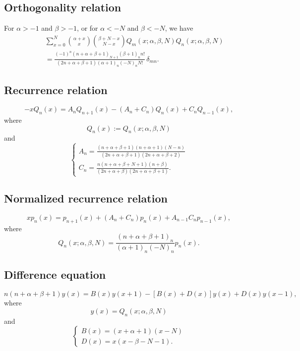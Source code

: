\documentclass[envcountchap,graybox]{svmono}
\begin{document}
\subsection*{Orthogonality relation}
For $\alpha>-1$ and $\beta>-1$, or for $\alpha<-N$ and $\beta<-N$, we have
\begin{eqnarray}
\label{OrtHahn}
& &\sum_{x=0}^N\binom{\alpha +x}{x}\binom{\beta+N-x}{N-x}Q_m(x;\alpha,\beta,N)Q_n(x;\alpha,\beta,N)\nonumber\\
& &{}=\frac{(-1)^n(n+\alpha+\beta+1)_{N+1}(\beta+1)_nn!}{(2n+\alpha+\beta+1)(\alpha+1)_n(-N)_nN!}\,\delta_{mn}.
\end{eqnarray}

\subsection*{Recurrence relation}
\begin{equation}
\label{RecHahn}
-xQ_n(x)=A_nQ_{n+1}(x)-\left(A_n+C_n\right)Q_n(x)+C_nQ_{n-1}(x),
\end{equation}
where
$$Q_n(x):=Q_n(x;\alpha,\beta,N)$$
and
$$\left\{\begin{array}{l}
\displaystyle A_n=\frac{(n+\alpha+\beta+1)(n+\alpha+1)(N-n)}{(2n+\alpha+\beta+1)(2n+\alpha+\beta+2)}\\[5mm]
\displaystyle C_n=\frac{n(n+\alpha+\beta+N+1)(n+\beta)}{(2n+\alpha+\beta)(2n+\alpha+\beta+1)}.
\end{array}\right.$$

\subsection*{Normalized recurrence relation}
\begin{equation}
\label{NormRecHahn}
xp_n(x)=p_{n+1}(x)+\left(A_n+C_n\right)p_n(x)+A_{n-1}C_np_{n-1}(x),
\end{equation}
where
$$Q_n(x;\alpha,\beta,N)=\frac{(n+\alpha+\beta+1)_n}{(\alpha+1)_n(-N)_n}p_n(x).$$

\subsection*{Difference equation}
\begin{equation}
\label{dvHahn}
n(n+\alpha+\beta+1)y(x)=B(x)y(x+1)-\left[B(x)+D(x)\right]y(x)+D(x)y(x-1),
\end{equation}
where
$$y(x)=Q_n(x;\alpha,\beta,N)$$
and
$$\left\{\begin{array}{l}
\displaystyle B(x)=(x+\alpha+1)(x-N)\\[5mm]
\displaystyle D(x)=x(x-\beta-N-1).
\end{array}\right.$$
\end{document}
